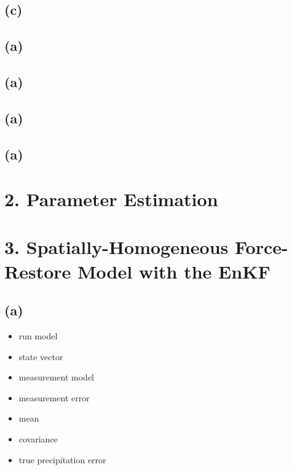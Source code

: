 \documentclass[letterpaper]{tufte-handout}
\begin{document}
\subsection{(c)}
\subsection{(a)}
\subsection{(a)}
\subsection{(a)}
\subsection{(a)}
\section{2. Parameter Estimation}
\section{3. Spatially-Homogeneous Force-Restore Model with the EnKF}
\subsection{(a)}
\begin{itemize}
  \item run model
  \item state vector
  \item measurement model
  \item measurement error
  \item mean
  \item covariance 
  \item true precipitation error
\end{itemize}
\end{document}
